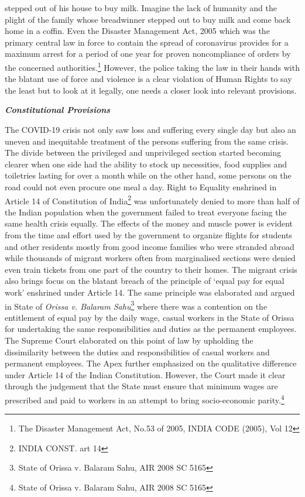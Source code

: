 \begin{multicols}{2}
stepped out of his house to buy milk. Imagine the lack of humanity and the plight of the
family whose breadwinner stepped out to buy milk and come back home in a coffin. Even the
Disaster Management Act, 2005 which was the primary central law in force to contain the
spread of coronavirus provides for a maximum arrest for a period of one year for proven noncompliance of orders by the concerned authorities.\footnote{The Disaster Management Act, No.53 of 2005, INDIA CODE (2005), Vol 12} However, the police taking the law in
their hands with the blatant use of force and violence is a clear violation of Human Rights to
say the least but to look at it legally, one needs a closer look into relevant provisions. 


\noi
{\large\it\bfseries{Constitutional Provisions}}

\noi
The COVID-19 crisis not only saw loss and suffering every single day but also an uneven and
inequitable treatment of the persons suffering from the same crisis. The divide between the
privileged and unprivileged section started becoming clearer when one side had the ability to
stock up necessities, food supplies and toiletries lasting for over a month while on the other hand, some persons on the road could not even procure one meal a day. Right to Equality
enshrined in Article 14 of Constitution of India\footnote{INDIA CONST. art 14 } was unfortunately denied to more than half
of the Indian population when the government failed to treat everyone facing the same health
crisis equally. The effects of the money and muscle power is evident from the time and effort
used by the government to organize flights for students and other residents mostly from good
income families who were stranded abroad while thousands of migrant workers often from
marginalised sections were denied even train tickets from one part of the country to their
homes. The migrant crisis also brings focus on the blatant breach of the principle of ‘equal
pay for equal work’ enshrined under Article 14. The same principle was elaborated and
argued in State of \textit{Orissa v. Balaram Sahu}\footnote{State of Orissa v. Balaram Sahu, AIR 2008 SC 5165} where there was a contention on the entitlement
of equal pay by the daily wage, casual workers in the State of Orissa for undertaking the same
responsibilities and duties as the permanent employees. The Supreme Court elaborated on
this point of law by upholding the dissimilarity between the duties and responsibilities of
casual workers and permanent employees. The Apex further emphasized on the qualitative
difference under Article 14 of the Indian Constitution. However, the Court made it clear
through the judgement that the State must ensure that minimum wages are prescribed and
paid to workers in an attempt to bring socio-economic parity.\footnote{State of Orissa v. Balaram Sahu, AIR 2008 SC 5165}


\end{multicols}
